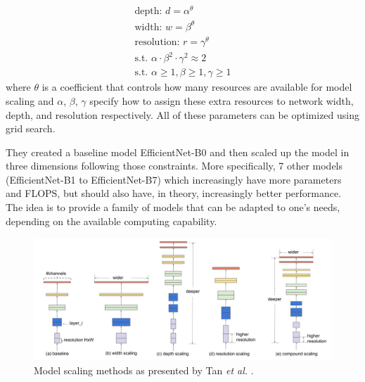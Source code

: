     \begin{equation}
        \begin{split}
            \text{depth: } d = \alpha^\theta \\
            \text{width: } w = \beta^\theta \\
            \text{resolution: } r = \gamma^\theta \\
            \text{s.t. } \alpha\cdot\beta^2\cdot\gamma^2\approx2 \\
            \text{s.t. } \alpha \geq 1, \beta \geq 1, \gamma \geq 1
            \label{eqs:efficientnetcompound}
        \end{split}
    \end{equation}
    where $\theta$ is a coefficient that controls how many resources are available for model scaling and $\alpha$, $\beta$, $\gamma$ specify how to assign these extra resources to network width, depth, and resolution respectively. All of these parameters can be optimized using grid search. \par
    
    They created a baseline model EfficientNet-B0 and then scaled up the model in three dimensions following those constraints. More specifically, 7 other models (EfficientNet-B1 to EfficientNet-B7) which increasingly have more parameters and \ac{FLOPS}, but should also have, in theory, increasingly better performance. The idea is to provide a family of models that can be adapted to one's needs, depending on the available computing capability.
    
    \begin{figure}[ht]
      \centering
        \includegraphics[scale=0.5, width=\linewidth]{figs/modelscaling.png}
      \caption{Model scaling methods as presented by Tan \textit{et al.} \cite{efficientnet}.}
      \label{fig:modelscaling}
    \end{figure}
    
